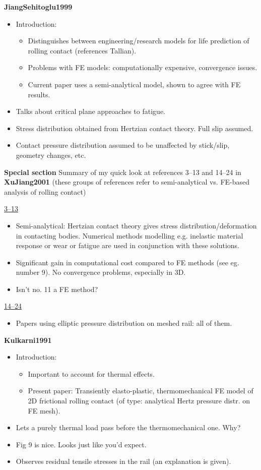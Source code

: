 \documentclass{article}
\begin{document}
\textbf{JiangSehitoglu1999}
\begin{itemize}
\item Introduction:
\begin{itemize}
\item Distinguishes between engineering/research models for life prediction of rolling contact (references Tallian).
\item Problems with FE models: computationally expensive, convergence issues.
\item Current paper uses a semi-analytical model, shown to agree with FE results.
\end{itemize}
\item Talks about critical plane approaches to fatigue.
\item Stress distribution obtained from Hertzian contact theory. Full slip assumed.
\item Contact pressure distribution assumed to be unaffected by stick/slip, geometry changes, etc.
\end{itemize}

\textbf{Special section}
Summary of my quick look at references 3--13 and 14--24 in \textbf{XuJiang2001} (these groups of references refer to semi-analytical vs. FE-based analysis of rolling contact)

\noindent
\underline{3--13}
\begin{itemize}
\item Semi-analytical: Hertzian contact theory gives stress distribution/deformation in contacting bodies. Numerical methods modelling e.g. inelastic material response or wear or fatigue are used in conjunction with these solutions.
\item Significant gain in computational cost compared to FE methods (see eg. number 9). No convergence problems, especially in 3D.
\item Isn't no. 11 a FE method?
\end{itemize}
\underline{14--24}
\begin{itemize}
\item Papers using elliptic pressure distribution on meshed rail: all of them.
\end{itemize}


\textbf{Kulkarni1991}
\begin{itemize}
\item Introduction:
\begin{itemize}
\item Important to account for thermal effects.
\item Present paper: Transiently elasto-plastic, thermomechanical FE model of 2D frictional rolling contact (of type: analytical Hertz pressure distr. on FE mesh).
\end{itemize}
\item Lets a purely thermal load pass before the thermomechanical one. Why?
\item Fig 9 is nice. Looks just like you'd expect.
\item Observes residual tensile stresses in the rail (an explanation is given).
\end{itemize}
\end{document}
